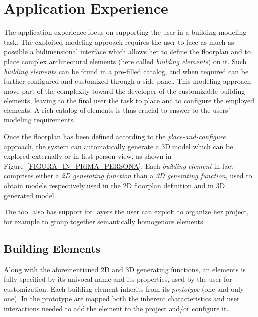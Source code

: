 \section{Application Experience}\label{sec:application}

The application experience focus on supporting the user in a building modeling task. The exploited modeling approach requires the user to face as much as possible a bidimensional interface which allows her to define the floorplan and to place complex architectural elements (here called \emph{building elements}) on it. Such \emph{building elements} can be found in a pre-filled catalog, and when required can be further configured and customized through a side panel. This modeling approach move part of the complexity toward the developer of the customizable building elements, leaving to the final user the task to place and to configure the employed elements. A rich catalog of elements is thus crucial to answer to the users' modeling requirements.

Once the floorplan has been defined according to the \emph{place-and-configure} approach, the system can automatically generate a 3D model which can be explored externally or in first person view, as shown in Figure~\ref{FIGURA_IN_PRIMA_PERSONA}. Each  \emph{building element} in fact comprises either a \emph{2D generating function} than a \emph{3D generating function}, used to obtain models respectively used in the 2D floorplan definition and in 3D generated model.

The tool also has support for layers the user can exploit to organize her project, for example to group together semantically homogenous elements.

\subsection{Building Elements}\label{ssec:elements}

Along with the aforementioned 2D and 3D generating functions, an elements is fully specified by its univocal name and its properties, used by the user for customization. Each building element inherits from its \emph{prototype} (one and only one). In the prototype are mapped both the inherent characteristics and user interactions needed to add the element to the project and/or configure it.

